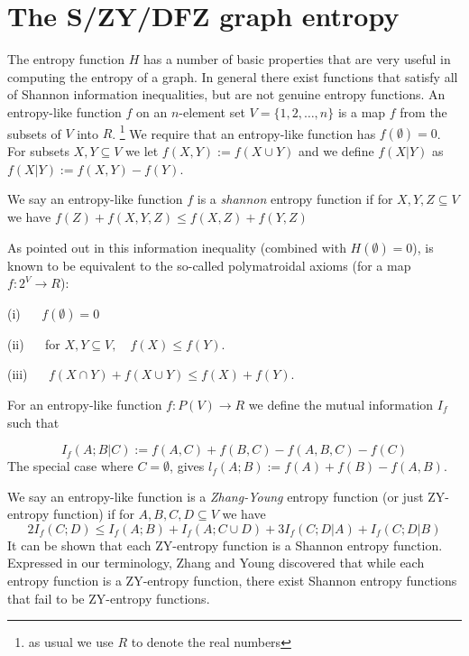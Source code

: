 \documentclass[12pt]{article}
\begin{document}
\section{The S/ZY/DFZ graph entropy}

The entropy function $H$ has a number of basic properties that are very useful in computing the entropy of a graph.  In general there exist functions that satisfy all of Shannon information inequalities, but are not genuine entropy functions. An entropy-like function $f$ on an $n$-element set $V=\{1,2,\ldots,n\}$ is a map $f$ from the subsets of $V$ into $R$. \footnote{as usual we use $R$ to denote the real numbers}  
We require that an entropy-like function has $f(\emptyset)=0$. For subsets $X,Y \subseteq V$ we let $f(X,Y):=f(X \cup Y)$ and we define $f(X | Y)$ as $f(X | Y):=f(X,Y)-f(Y)$. 

We say an entropy-like function $f$ is a {\it shannon} entropy function if for $X,Y,Z \subseteq V$
we have $f(Z) + f(X,Y,Z) \leq f(X,Z) + f(Y,Z)$

As pointed out in \cite{DFZ07} this information inequality (combined with $H(\emptyset)=0$),
is known to be equivalent to the so-called polymatroidal axioms (for a map $f: 2^V \rightarrow R$): 

\medskip

\noindent
(i) $\quad$  $f(\emptyset)=0$ 

\smallskip

\noindent
(ii) $\quad$ for $X,Y \subseteq V, \quad f(X) \leq f(Y)$. 

\smallskip

\noindent
(iii) $\quad$ $f(X \cap Y) + f(X \cup Y) \leq f(X) +f(Y)$. 

\medskip

For an entropy-like function $f: P(V) \rightarrow R$ we define the mutual information $I_f$ such that

\begin{equation}
I_f(A;B | C):=f(A,C)+f(B,C)-f(A,B,C)-f(C)
\end{equation}
The special case where $C=\emptyset$,  gives $ l_f(A;B):=f(A)+f(B)-f(A,B)$.

We say an entropy-like function is a {\it Zhang-Young} entropy function (or just ZY-entropy function) if for $A,B,C,D \subseteq V$ we have 
\begin{equation}
2I_f(C;D)\leq I_f(A;B)+I_f(A; C\cup D)+3I_f(C; D | A) + I_f(C;D | B)
\end{equation}
It can be shown that each ZY-entropy function is a Shannon entropy function. Expressed in our terminology, Zhang and Young discovered \cite{ZY97} that while each entropy function is a ZY-entropy function, there exist Shannon entropy functions that fail to be ZY-entropy functions.
\end{document}
